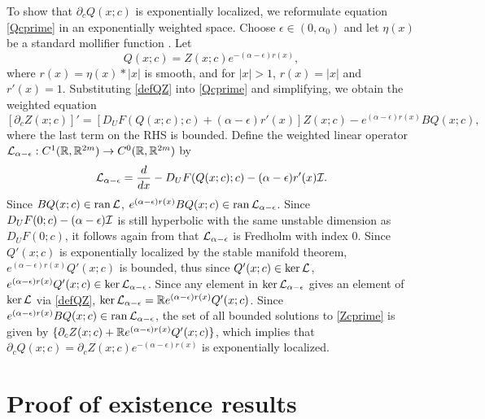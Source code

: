 \documentclass[12pt]{elsarticle}
\theoremstyle{plain}
\theoremstyle{definition}
\theoremstyle{remark}
\numberwithin{theorem}{section}
\numberwithin{equation}{section}
\begin{document}
To show that $\partial_c Q(x; c)$ is exponentially localized, we reformulate equation \cref{Qcprime} in an exponentially weighted space. Choose $\epsilon \in (0,\alpha_0)$ and let $\eta(x)$ be a standard mollifier function \cite[Section~C.5]{Evans2010}. Let
\begin{equation}\label{defQZ}
Q(x; c) = Z(x; c) e^{-(\alpha - \epsilon)r(x)},
\end{equation}
where $r(x) = \eta(x) * |x|$ is smooth, and for $|x| > 1$, $r(x) = |x|$ and $r'(x) = 1$. Substituting \cref{defQZ} into \cref{Qcprime} and simplifying, we obtain the weighted equation
\begin{equation}\label{Zcprime}
[\partial_c Z(x; c)]' = [D_U F(Q(x;c); c) + (\alpha - \epsilon) r'(x) ] Z(x; c) - e^{(\alpha - \epsilon)r(x)} B Q(x;c),
\end{equation}
where the last term on the RHS is bounded. Define the weighted linear operator $\mathcal{L}_{\alpha - \epsilon}: C^1(\mathbb{R}, \mathbb{R}^{2m}) \rightarrow C^0(\mathbb{R}, \mathbb{R}^{2m})$ by
\begin{equation}\label{defLtvalpha}
\mathcal{L}_{\alpha - \epsilon} = \frac{d}{dx} - D_U F(Q(x;c); c) - (\alpha - \epsilon) r'(x) \mathcal{I}.
\end{equation}
Since $B Q(x;c) \in \operatorname{ran} \mathcal{L}$, $e^{(\alpha - \epsilon)r(x)} B Q(x;c) \in \operatorname{ran} \mathcal{L}_{\alpha - \epsilon}$. Since $D_U F(0; c)-(\alpha-\epsilon)\mathcal{I}$ is still hyperbolic with the same unstable dimension as $D_U F(0; c)$, it follows again from \cite[Lemma 4.2]{Palmer1984} that $\mathcal{L}_{\alpha - \epsilon}$ is Fredholm with index 0. Since $Q'(x; c)$ is exponentially localized by the stable manifold theorem, $e^{(\alpha - \epsilon)r(x)} Q'(x; c)$ is bounded, thus since $Q'(x; c) \in \mathop\mathrm{ker}\nolimits \mathcal{L}$, $e^{(\alpha - \epsilon)r(x)} Q'(x; c) \in \mathop\mathrm{ker}\nolimits \mathcal{L}_{\alpha - \epsilon}$. Since any element in $\mathop\mathrm{ker}\nolimits \mathcal{L}_{\alpha - \epsilon}$ gives an element of $\mathop\mathrm{ker}\nolimits \mathcal{L}$ via \cref{defQZ}, $\mathop\mathrm{ker}\nolimits \mathcal{L}_{\alpha - \epsilon} = \mathbb{R} e^{(\alpha - \epsilon)r(x)} Q'(x; c)$. Since $e^{(\alpha - \epsilon)r(x)} B Q(x;c) \in \operatorname{ran} \mathcal{L}_{\alpha - \epsilon}$, the set of all bounded solutions to \cref{Zcprime} is given by $\{ \partial_c Z(x; c) + \mathbb{R} e^{(\alpha - \epsilon)r(x)} Q'(x;c) \}$, which implies that $\partial_c Q(x; c) = \partial_c Z (x; c) e^{-(\alpha - \epsilon)r(x)}$ is exponentially localized.

\section{Proof of existence results}\label{sec:existproof}
\end{document}
